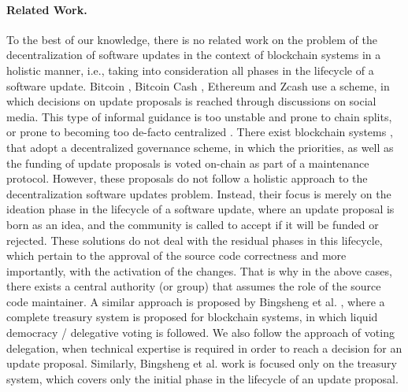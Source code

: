 \paragraph{Related Work.}
To the best of our knowledge, there is no related work on the problem of the decentralization of software updates in the context of blockchain systems in a holistic manner, i.e., taking into consideration all phases in the lifecycle of a software update.
Bitcoin \cite{bitcoin}, Bitcoin Cash \cite{bitcoincash}, Ethereum 
\cite{ethereum} and Zcash \cite{zerocash} use a  scheme, 
in which decisions on update proposals is reached through discussions on social 
media. This type of informal guidance is  too unstable and prone to chain 
splits, or prone to becoming too de-facto centralized \cite{buterin_on_gov}. 
There exist blockchain systems \cite{dash}, \cite{decred} that adopt a 
decentralized governance scheme, in which the priorities, as well as the 
funding of update proposals is voted on-chain as part of a maintenance 
protocol. However, these proposals do not follow a holistic approach to the 
decentralization software updates problem. Instead, their focus is merely on 
the ideation phase in the lifecycle of a software update, where an update 
proposal is born as an idea, and the community is called to accept if it will 
be funded or rejected. These solutions do not deal with the residual phases in 
this lifecycle, which pertain to the approval of the source code correctness 
and more importantly, with the activation of the changes. That is why in the 
above cases, there exists a central authority (or group) that assumes the role 
of the source code maintainer. A similar approach is proposed by Bingsheng et 
al. \cite{treasury}, where a complete treasury system is proposed for 
blockchain systems, in which liquid democracy / delegative voting is followed. 
We also follow the approach of voting delegation, when technical expertise is 
required in order to reach a decision for an update proposal. Similarly, 
Bingsheng et al. work is focused only on the treasury system, which covers only 
the initial phase in the lifecycle of an update proposal.


%
